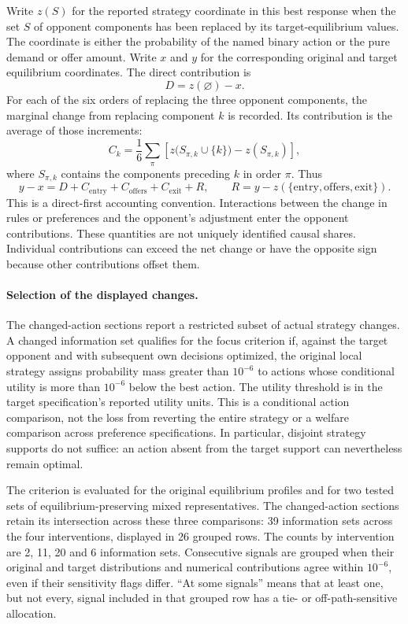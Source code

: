 Write $z(S)$ for the reported strategy coordinate in this best response when
the set $S$ of opponent components has been replaced by its target-equilibrium
values. The coordinate is either the probability of the named binary action or
the pure demand or offer amount. Write $x$ and $y$ for the corresponding original
and target equilibrium coordinates. The direct contribution is
\[
  D=z(\varnothing)-x.
\]
For each of the six orders of replacing the three opponent components, the
marginal change from replacing component $k$ is recorded. Its contribution is
the average of those increments:
\[
  C_k=\frac{1}{6}\sum_{\pi}
  \left[z\bigl(S_{\pi,k}\cup\{k\}\bigr)-z(S_{\pi,k})\right],
\]
where $S_{\pi,k}$ contains the components preceding $k$ in order $\pi$. Thus
\[
  y-x=D+C_{\mathrm{entry}}+C_{\mathrm{offers}}+C_{\mathrm{exit}}+R,
  \qquad R=y-z(\{\mathrm{entry},\mathrm{offers},\mathrm{exit}\}).
\]
This is a direct-first accounting convention. Interactions between the change
in rules or preferences and the opponent's adjustment enter the opponent
contributions. These quantities are not uniquely identified causal shares.
Individual contributions can exceed the net change or have the opposite sign
because other contributions offset them.

\paragraph{Selection of the displayed changes.}
The changed-action sections report a restricted subset of actual strategy changes. A changed
information set qualifies for the focus criterion if, against the target
opponent and with subsequent own decisions optimized, the original local
strategy assigns probability mass greater than $10^{-6}$ to actions whose
conditional utility is more than $10^{-6}$ below the best action. The utility
threshold is in the target specification's reported utility units. This is a
conditional action comparison, not the loss from reverting the entire strategy
or a welfare comparison across preference specifications. In particular,
disjoint strategy supports do not suffice: an action absent from the target
support can nevertheless remain optimal.

The criterion is evaluated for the original equilibrium profiles and for two
tested sets of equilibrium-preserving mixed representatives. The
changed-action sections retain its intersection across these three comparisons: 39 information
sets across the four interventions, displayed in 26 grouped rows. The counts by
intervention are 2, 11, 20 and 6 information sets. Consecutive signals are grouped
when their original and target distributions and numerical contributions agree
within $10^{-6}$, even if their sensitivity flags differ. ``At some signals''
means that at least one, but not every, signal included in that grouped row has
a tie- or off-path-sensitive allocation.

